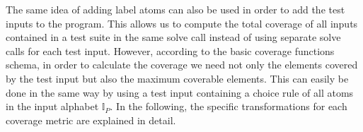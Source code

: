The same idea of adding label atoms can also be used in order to add the test inputs to the program. This allows us to compute the total coverage of all inputs contained in a test suite in the same solve call instead of using separate solve calls for each test input. However, according to the basic coverage functions schema, in order to calculate the coverage we need not only the elements covered by the test input but also the maximum coverable elements. This can easily be done in the same way by using a test input containing a choice rule of all atoms in the input alphabet $\mathbb{I}_P$. In the following, the specific transformations for each coverage metric are explained in detail.

\begin{comment}
    - the goal is to compute the coverage using ASP     \/
    
    -> introduce labels for each coverage metric -> add them to the program in a specific way (based on the coverage metric)  -> solve normally using clingo -> if the label is in the answer set, the corresponding object is covered      \/
    
    - I only add new rules, dont change or take away existing ones (except constraints -> see above) and these new rules only produce labels not predicates that are part of the original program -> the resulting program is still equivalent! (maybe proof?)      \/
    
    - with this method, to find total positive and negative coverage it is not necessary to look at every model in the solve call. Instead use one solve call with brave consequences and one with cautious consequences! -> more efficient than looking at every model!        \/
    
    - labels can also be used to add the testcases to the program -> this way coverage for all testcases can be computed in the same solve call instead of needing one call per testcase        \/
    
    -> this is done by: adding a choice rule $\{\_i0;...;\_in\}$. for n testcases in the testsuite, adding rules $a_i :- i_j$. for every atom i in the testcase j.
    (- why does this work?
    - why does this not change the program?)
    
    - maximum coverage needs to be computed to get accurate coverage numbers!       \/
    
    -> done by calculating the coverage normally but instead of testcases adding a rule $\{a_0;...;a_n\}$. where $a_0...a_n$ are all possible inputatoms (see definition input/output) -> these have to be specified in advance by the user!
\end{comment}

